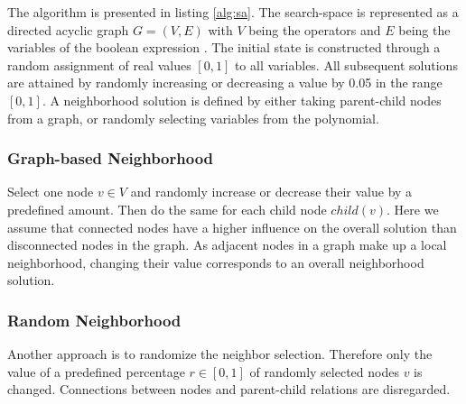 \documentclass{article}
\begin{document}
The algorithm is presented in listing \ref{alg:sa}. The search-space
is represented as a directed acyclic graph $G=(V,E)$ with $V$ being the
operators and $E$ being the variables of the boolean expression  . The initial state is constructed through a random
assignment of real values $[0,1]$ to all variables. All subsequent
solutions are attained by randomly increasing or decreasing a value by
0.05 in the range $[0,1]$. A neighborhood solution is defined by
either taking parent-child nodes from a graph, or randomly selecting
variables from the polynomial.

\subsubsection{Graph-based Neighborhood}
\label{subsubsec:neighborhoodA}
Select one node $v \in V$ and randomly increase or decrease their
value by a predefined amount. Then do the same for each child node
$child(v)$. Here we assume that connected nodes have a higher
influence on the overall solution than disconnected nodes in the
graph. As adjacent nodes in a graph make up a local neighborhood,
changing their value corresponds to an overall neighborhood solution.
\subsubsection{Random Neighborhood}
\label{subsubsec:neighborhoodB}

Another approach is to randomize the neighbor selection. Therefore
only the value of a predefined percentage $r \in [0,1]$ of randomly
selected nodes $v$ is changed. Connections between nodes and
parent-child relations are disregarded.
\end{document}
